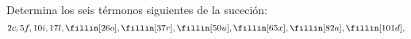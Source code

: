 
\question Determina los seis térmonos siguientes de la suceción:
\[
  2c, 5f, 10i, 17l, \fillin[26o], \fillin[37r], \fillin[50u], \fillin[65x],
  \fillin[82a], \fillin[101d], 
\]
